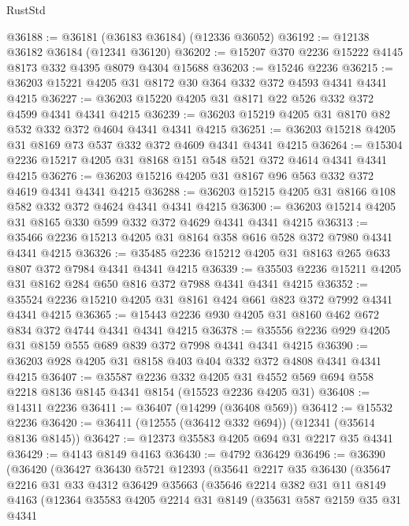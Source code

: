 \begin{lexlean}{RustStd}
\begin{coremodule}
@36188 := @36181 (@36183 @36184) (@12336 @36052)
@36192 := @12138 @36182 @36184 (@12341 @36120)
@36202 := @15207 @370 @2236 @15222 @4145 @8173 @332 @4395 @8079 @4304 @15688
@36203 := @15246 @2236
@36215 := @36203 @15221 @4205 @31 @8172 @30 @364 @332 @372 @4593 @4341 @4341 @4215
@36227 := @36203 @15220 @4205 @31 @8171 @22 @526 @332 @372 @4599 @4341 @4341 @4215
@36239 := @36203 @15219 @4205 @31 @8170 @82 @532 @332 @372 @4604 @4341 @4341 @4215
@36251 := @36203 @15218 @4205 @31 @8169 @73 @537 @332 @372 @4609 @4341 @4341 @4215
@36264 := @15304 @2236 @15217 @4205 @31 @8168 @151 @548 @521 @372 @4614 @4341 @4341 @4215
@36276 := @36203 @15216 @4205 @31 @8167 @96 @563 @332 @372 @4619 @4341 @4341 @4215
@36288 := @36203 @15215 @4205 @31 @8166 @108 @582 @332 @372 @4624 @4341 @4341 @4215
@36300 := @36203 @15214 @4205 @31 @8165 @330 @599 @332 @372 @4629 @4341 @4341 @4215
@36313 := @35466 @2236 @15213 @4205 @31 @8164 @358 @616 @528 @372 @7980 @4341 @4341 @4215
@36326 := @35485 @2236 @15212 @4205 @31 @8163 @265 @633 @807 @372 @7984 @4341 @4341 @4215
@36339 := @35503 @2236 @15211 @4205 @31 @8162 @284 @650 @816 @372 @7988 @4341 @4341 @4215
@36352 := @35524 @2236 @15210 @4205 @31 @8161 @424 @661 @823 @372 @7992 @4341 @4341 @4215
@36365 := @15443 @2236 @930 @4205 @31 @8160 @462 @672 @834 @372 @4744 @4341 @4341 @4215
@36378 := @35556 @2236 @929 @4205 @31 @8159 @555 @689 @839 @372 @7998 @4341 @4341 @4215
@36390 := @36203 @928 @4205 @31 @8158 @403 @404 @332 @372 @4808 @4341 @4341 @4215
@36407 := @35587
    @2236
    @332
    @4205
    @31
    @4552
    @569
    @694
    @558
    @2218
    @8136
    @8145
    @4341
    @8154
    (@15523 @2236 @4205 @31)
@36408 := @14311 @2236
@36411 := @36407 (@14299 (@36408 @569))
@36412 := @15532 @2236
@36420 := @36411 (@12555 (@36412 @332 @694)) (@12341 (@35614 @8136 @8145))
@36427 := @12373 @35583 @4205 @694 @31 @2217 @35 @4341
@36429 := @4143 @8149 @4163
@36430 := @4792 @36429
@36496 := @36390
    (@36420
      (@36427
        @36430
        @5721
        @12393
        (@35641
          @2217
          @35
          @36430
          (@35647
            @2216
            @31
            @33
            @4312
            @36429
            @35663
            (@35646
              @2214
              @382
              @31
              @11
              @8149
              @4163
              (@12364
                @35583
                @4205
                @2214
                @31
                @8149
                (@35631
                  @587
                  @2159
                  @35
                  @31
                  @4341

\end{coremodule}
\end{lexlean}

